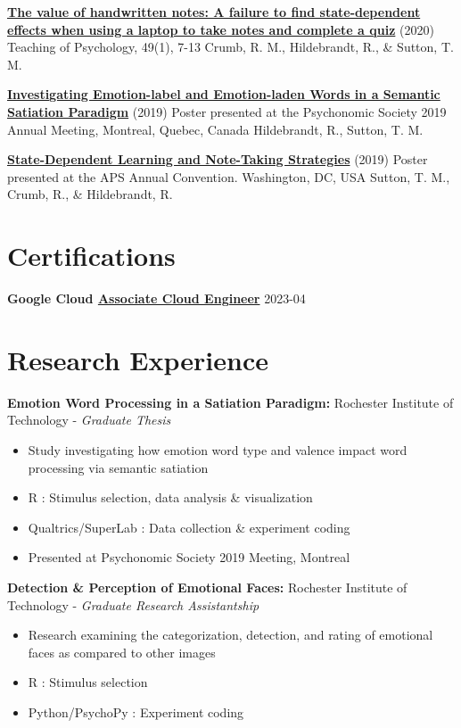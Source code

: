 \documentclass[a4paper,9pt]{extarticle}
\begin{document}
\noindent
\textbf{\href{http://dx.doi.org/10.1177/0098628320979895}{The value of handwritten notes: A failure to find state-dependent effects when using a laptop to take notes and complete a quiz}} (2020)
Teaching of Psychology, 49(1), 7-13
Crumb, R. M., Hildebrandt, R., \& Sutton, T. M.

\noindent
\textbf{\href{}{Investigating Emotion-label and Emotion-laden Words in a Semantic Satiation Paradigm}} (2019)
Poster presented at the Psychonomic Society 2019 Annual Meeting, Montreal, Quebec, Canada
Hildebrandt, R., Sutton, T. M.

\noindent
\textbf{\href{}{State-Dependent Learning and Note-Taking Strategies}} (2019)
Poster presented at the APS Annual Convention. Washington, DC, USA
Sutton, T. M., Crumb, R., \& Hildebrandt, R.

\section*{Certifications}

\noindent
\textbf{Google Cloud \href{https://google.accredible.com/d3ef369f-9c2c-486a-bda6-943a74f70dff}{Associate Cloud Engineer}} \hfill 2023-04

\section*{Research Experience}

\noindent
\textbf{Emotion Word Processing in a Satiation Paradigm:}
Rochester Institute of Technology - \textit{Graduate Thesis}
\begin{itemize}
\item Study investigating how emotion word type and valence impact word processing via semantic satiation
\item R : Stimulus selection, data analysis \& visualization
\item Qualtrics/SuperLab : Data collection \& experiment coding
\item Presented at Psychonomic Society 2019 Meeting, Montreal
\end{itemize}

\noindent
\textbf{Detection \& Perception of Emotional Faces:}
Rochester Institute of Technology - \textit{Graduate Research Assistantship}
\begin{itemize}
\item Research examining the categorization, detection, and rating of emotional faces as compared to other images
\item R : Stimulus selection
\item Python/PsychoPy : Experiment coding
\end{itemize}
\end{document}
